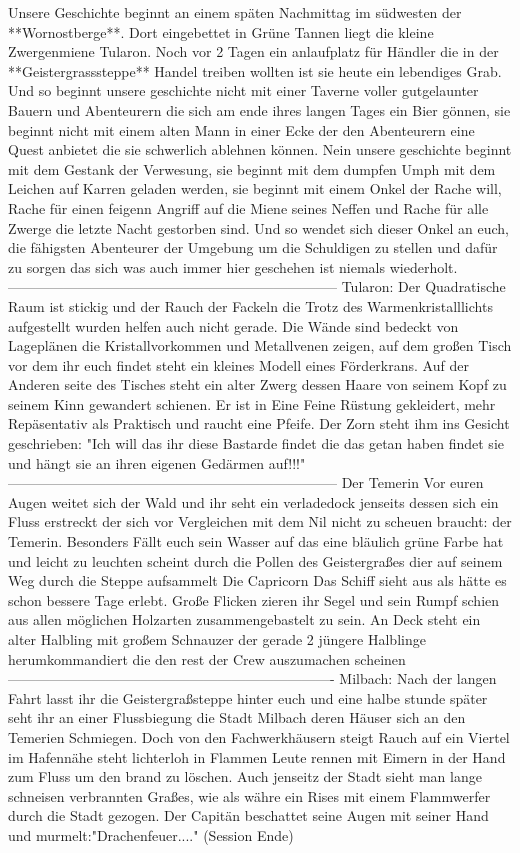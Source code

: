 \documentclass[10pt,twoside,twocolumn,openany]{book}
\begin{document}
	Unsere Geschichte beginnt an einem späten Nachmittag im südwesten der **Wornostberge**. Dort eingebettet in Grüne Tannen liegt die kleine Zwergenmiene Tularon. Noch vor 2 Tagen ein anlaufplatz für Händler die in der **Geistergrasssteppe** Handel treiben wollten ist sie heute ein lebendiges Grab.
	Und so beginnt unsere geschichte nicht mit einer Taverne voller gutgelaunter Bauern und Abenteurern die sich am ende ihres langen Tages ein Bier gönnen, sie beginnt nicht mit einem alten Mann in einer Ecke der den Abenteurern eine Quest anbietet die sie schwerlich ablehnen können.
	Nein unsere geschichte beginnt mit dem Gestank der Verwesung, sie beginnt mit dem dumpfen Umph mit dem Leichen auf Karren geladen werden, sie beginnt mit einem Onkel der Rache will, Rache für einen feigenn Angriff auf die Miene seines Neffen und Rache für alle Zwerge die letzte Nacht gestorben sind. Und so wendet sich dieser Onkel an euch, die fähigsten Abenteurer der Umgebung um die Schuldigen zu stellen und dafür zu sorgen das sich was auch immer hier geschehen ist niemals wiederholt.
	-----------------------------------------------------------------------
	Tularon:
	Der Quadratische Raum ist stickig und der Rauch der Fackeln die Trotz des Warmenkristalllichts aufgestellt wurden helfen auch nicht gerade. Die Wände sind bedeckt von Lageplänen die Kristallvorkommen und Metallvenen zeigen, auf dem großen Tisch vor dem ihr euch findet steht ein kleines Modell eines Förderkrans. Auf der Anderen seite des Tisches steht ein alter Zwerg dessen Haare von seinem Kopf zu seinem Kinn gewandert schienen. Er ist in Eine Feine Rüstung gekleidert, mehr Repäsentativ als Praktisch und raucht eine Pfeife. Der Zorn steht ihm ins Gesicht geschrieben:
	"Ich will das ihr diese Bastarde findet die das getan haben findet sie und hängt sie an ihren eigenen Gedärmen auf!!!"
	-----------------------------------------------------------------------
	Der Temerin
	Vor euren Augen weitet sich der Wald und ihr seht ein verladedock jenseits dessen sich ein Fluss erstreckt der sich vor Vergleichen mit dem Nil nicht zu scheuen braucht: der Temerin.
	Besonders Fällt euch sein Wasser auf das eine bläulich grüne Farbe hat und leicht zu leuchten scheint durch die Pollen des Geistergraßes dier auf seinem Weg durch die Steppe aufsammelt
	Die Capricorn
	Das Schiff sieht aus als hätte es schon bessere Tage erlebt. Große Flicken zieren ihr Segel und sein Rumpf schien aus allen möglichen Holzarten zusammengebastelt zu sein.
	An Deck steht ein alter Halbling mit großem Schnauzer der gerade 2 jüngere Halblinge herumkommandiert die den rest der Crew auszumachen scheinen
	----------------------------------------------------------------------
	Milbach:
	Nach der langen Fahrt lasst ihr die Geistergraßsteppe hinter euch und eine halbe stunde später seht ihr an einer Flussbiegung die Stadt Milbach deren Häuser sich an den Temerien Schmiegen. Doch von den Fachwerkhäusern steigt Rauch auf ein Viertel im Hafennähe steht lichterloh in Flammen Leute rennen mit Eimern in der Hand zum Fluss um den brand zu löschen. Auch jenseitz der Stadt sieht man lange schneisen verbrannten Graßes, wie als währe ein Rises mit einem Flammwerfer durch die Stadt gezogen.
	Der Capitän beschattet seine Augen mit seiner Hand und murmelt:"Drachenfeuer...." (Session Ende)
	
\end{document}
